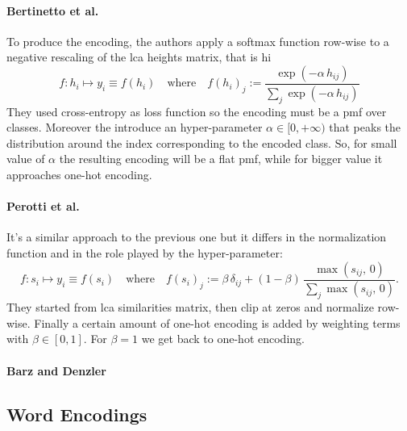 \paragraph{Bertinetto et al.~\cite{MakingBetterMBertin2019}}
To produce the encoding, the authors apply a softmax function row-wise to a
negative rescaling of the lca heights matrix, that is hi
\begin{equation}
  f : h_i \mapsto y_i \equiv f(h_i)
  \quad \textrm{where} \quad
  f (h_i)_j := \frac{\exp \left({-\alpha \, h_{ij}}\right)}
  {\sum_j \exp\left({-\alpha \, h_{ij}}\right)}
  \label{eq:mbm-hierarchical-encoding}
\end{equation}
They used cross-entropy as loss function so the encoding must be a
\acrshort{pmf} over classes. Moreover the introduce an hyper-parameter $\alpha
\in [0, +\infty)$ that peaks the distribution around the index corresponding to
the encoded class. So, for small value of $\alpha$ the resulting encoding will
be a flat \acrshort{pmf}, while for bigger value it approaches one-hot
encoding.

\paragraph{Perotti et al.~\cite{BeyondOneHotPerott2023}} It's a similar
approach to the previous one but it differs in the normalization function and
in the role played by the hyper-parameter:
\begin{equation}
  f :  s_i \mapsto y_i \equiv f(s_i)
  \quad \textrm{where} \quad
  f (s_i)_j := \beta \, \delta_{ij} +
  \left(1 - \beta \right) \, \frac{\max \left(s_{ij},\,0\right)}
  {\sum_j \max \left(s_{ij},\,0\right)}.
  \label{eq:b3p-hierarchical-encoding}
\end{equation}
They started from \acrshort{lca} similarities matrix, then clip at zeros and
normalize row-wise. Finally a certain amount of one-hot encoding is added by
weighting terms with $\beta \in [0, 1]$. For $\beta = 1$ we get back to one-hot
encoding.

\paragraph{Barz and Denzler~\cite{HierarchyBasedBarz2018}}


\subsection{Word Encodings}
\label{subsec:word-encoding}

